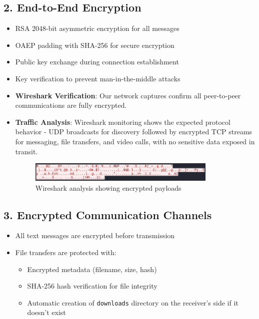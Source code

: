 \documentclass{article}
\begin{document}
\subsection*{2. End-to-End Encryption}
\begin{itemize}
    \item RSA 2048-bit asymmetric encryption for all messages
    \item OAEP padding with SHA-256 for secure encryption
    \item Public key exchange during connection establishment
    \item Key verification to prevent man-in-the-middle attacks
    \item \textbf{Wireshark Verification}: Our network captures confirm all peer-to-peer communications are fully encrypted.
    \item \textbf{Traffic Analysis}: Wireshark monitoring shows the expected protocol behavior - UDP broadcasts for discovery followed by encrypted TCP streams for messaging, file transfers, and video calls, with no sensitive data exposed in transit.

    \begin{figure}[h]
        \centering
        \includegraphics[width=0.85\textwidth]{wireshark.png}
        \caption{Wireshark analysis showing encrypted payloads}
    \end{figure}
\end{itemize}

\subsection*{3. Encrypted Communication Channels}
\begin{itemize}
    \item All text messages are encrypted before transmission
    \item File transfers are protected with:
    \begin{itemize}
        \item Encrypted metadata (filename, size, hash)
        \item SHA-256 hash verification for file integrity
        \item Automatic creation of \texttt{downloads} directory on the receiver's side if it doesn't exist
    \end{itemize}
\end{itemize}
\end{document}
